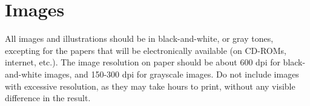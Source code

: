     \section{Images}

    All images and illustrations should be in black-and-white, or gray tones,
    excepting for the papers that will be electronically available (on CD-ROMs,
    internet, etc.). The image resolution on paper should be about 600 dpi for
    black-and-white images, and 150-300 dpi for grayscale images. Do not include
    images with excessive resolution, as they may take hours to print, without any
    visible difference in the result.
